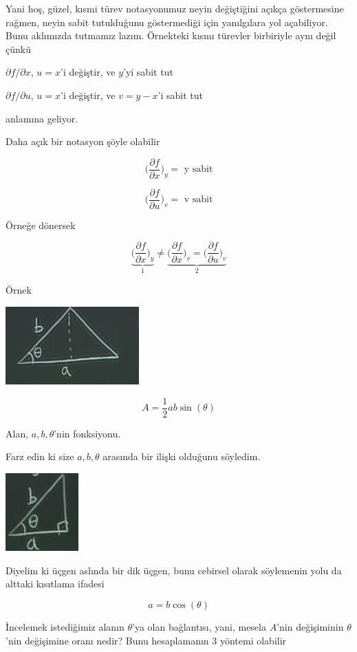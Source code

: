 \documentclass[12pt,fleqn]{article}\usepackage{../../common}
\begin{document}
Yani hoş, güzel, kısmi türev notasyonumuz neyin değiştiğini açıkça
göstermesine rağmen, neyin sabit tutulduğunu göstermediği için yanılgılara
yol açabiliyor. Bunu aklımızda tutmamız lazım. Örnekteki kısmı türevler
birbiriyle aynı değil çünkü 

$\partial f/\partial x$, $u=x$'i değiştir, ve $y$'yi sabit tut

$\partial f/\partial u$, $u=x$'i değiştir, ve $v = y-x$'i sabit tut

anlamına geliyor. 

Daha açık bir notasyon şöyle olabilir

$$ 
\bigg( \frac{\partial f}{\partial x}  \bigg)_y = \textrm { y sabit}
$$

$$ 
\bigg( \frac{\partial f}{\partial u}  \bigg)_v = \textrm { v sabit}
$$

Örneğe dönersek

$$ 
\underbrace{
\bigg( \frac{\partial f}{\partial x}  \bigg)_y 
}_{1} 
\ne 
\underbrace{
\bigg( \frac{\partial f}{\partial x}  \bigg)_v = 
\bigg( \frac{\partial f}{\partial u}  \bigg)_v 
}_{2}
$$

Örnek

\includegraphics[height=3cm]{14_1.png}

$$
A = \frac{1}{2}ab \sin(\theta)
$$

Alan, $a,b,\theta$'nin fonksiyonu. 

Farz edin ki size $a,b,\theta$ arasında bir ilişki olduğunu söyledim. 

\includegraphics[height=3cm]{14_2.png}

Diyelim ki üçgen aslında bir dik üçgen, bunu cebirsel olarak söylemenin yolu da
alttaki kısıtlama ifadesi

$$ a = b \cos(\theta) $$

İncelemek istediğimiz alanın $\theta$'ya olan bağlantısı, yani, mesela
$A$'nin değişiminin $\theta$'nin değişimine oranı nedir? Bunu hesaplamanın
3 yöntemi olabilir
\end{document}
